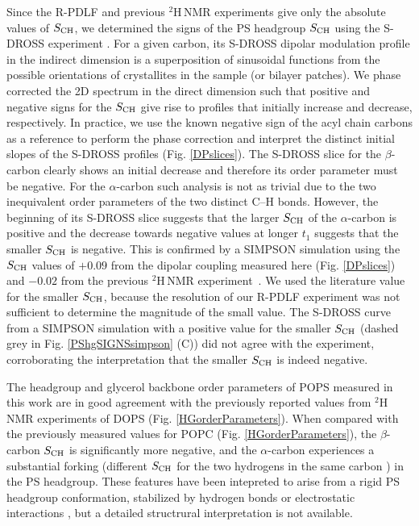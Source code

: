 \documentclass[journal=jpcbfk,manuscript=article]{achemso}
\begin{document}
Since the R-PDLF and previous $^2$H\,NMR experiments \cite{browning80,roux91} give 
only the absolute values of  $S_{\rm CH}$, we determined the signs of the PS headgroup
 $S_{\rm CH}$ using the S-DROSS experiment \cite{gross97}.
For a given carbon, its S-DROSS dipolar modulation profile in the indirect dimension is a superposition
of sinusoidal functions from the possible orientations of crystallites in the sample (or bilayer patches).
We phase corrected the 2D spectrum in the direct dimension such that positive and negative signs for the $S_{\rm CH}$ 
give rise to profiles that initially increase and decrease, respectively.
In practice, we use the known negative sign of the acyl chain carbons as a reference to perform
the phase correction and interpret the distinct initial slopes of the S-DROSS profiles (Fig. \ref{DPslices}). 
The S-DROSS slice for the $\beta$-carbon clearly shows an initial decrease and therefore its order parameter must be negative.
For the $\alpha$-carbon such analysis is not as trivial due to the two inequivalent order parameters of the two distinct C--H bonds.
However, the beginning of its S-DROSS slice suggests that the larger $S_{\rm CH}$ of the $\alpha$-carbon is positive and the
decrease towards negative values at longer $t_1$ suggests that the smaller  $S_{\rm CH}$ is negative.    
This is confirmed by a SIMPSON simulation
using the  $S_{\rm CH}$ values of $+0.09$ from the dipolar coupling measured here (Fig. \ref{DPslices})
and $-0.02$ from the previous $^2$H\,NMR experiment~\cite{roux91}.
We used the literature value for the smaller  $S_{\rm CH}$, because the
resolution of our R-PDLF experiment was not sufficient to determine the
magnitude of the small value.
The S-DROSS curve from a SIMPSON simulation with a positive value for the smaller  $S_{\rm CH}$ 
(dashed grey in Fig. \ref{PShgSIGNSsimpson} (C)) did not agree with the experiment, 
corroborating the interpretation that the smaller  $S_{\rm CH}$ is indeed negative.

The headgroup and glycerol backbone order parameters of 
POPS measured in this work are in good agreement with the previously reported
values from $^2$H\,NMR experiments of DOPS \cite{browning80} (Fig. \ref{HGorderParameters}).
When compared with the previously measured values for POPC \cite{ferreira13} (Fig. \ref{HGorderParameters}),
the $\beta$-carbon  $S_{\rm CH}$ is significantly more negative, and the $\alpha$-carbon
experiences a substantial forking (different  $S_{\rm CH}$ for the two hydrogens in the same carbon \cite{ollila16}) in the PS headgroup.
These features have been intepreted to arise from a rigid PS headgroup
conformation, stabilized by hydrogen bonds or electrostatic
interactions \cite{browning80,buldt81}, but a detailed structrural interpretation is not
available. 
\end{document}
